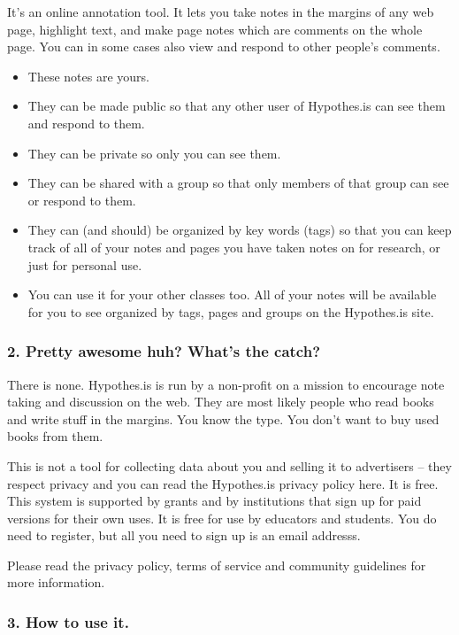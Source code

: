 \documentclass[12pt, openany]{book}
\begin{document}
It's an online annotation tool. It lets you take notes in the margins of any web page, highlight text, and make page notes which are comments on the whole page. You can in some cases also view and respond to other people's comments.

\begin{itemize}
\item
  These notes are yours.
\item
  They can be made public so that any other user of Hypothes.is can see them and respond to them.
\item
  They can be private so only you can see them.
\item
  They can be shared with a group so that only members of that group can see or respond to them.
\item
  They can (and should) be organized by key words (tags) so that you can keep track of all of your notes and pages you have taken notes on for research, or just for personal use.
\item
  You can use it for your other classes too. All of your notes will be available for you to see organized by tags, pages and groups on the Hypothes.is site.
\end{itemize}

\hypertarget{pretty-awesome-huh-whats-the-catch}{%
\subsubsection*{2. Pretty awesome huh? What's the catch?}\label{pretty-awesome-huh-whats-the-catch}}


There is none. Hypothes.is is run by a non-profit on a mission to encourage note taking and discussion on the web. They are most likely people who read books and write stuff in the margins. You know the type. You don't want to buy used books from them.

This is not a tool for collecting data about you and selling it to advertisers -- they respect privacy and you can read the Hypothes.is privacy policy here. It is free. This system is supported by grants and by institutions that sign up for paid versions for their own uses. It is free for use by educators and students. You do need to register, but all you need to sign up is an email addresss.

Please read the privacy policy, terms of service and community guidelines for more information.

\hypertarget{how-to-use-it.}{%
\subsubsection*{3. How to use it.}\label{how-to-use-it.}}
\end{document}
